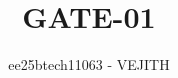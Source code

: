 \documentclass[journal]{IEEEtran}
\begin{document}

\vspace{3cm}


\title{GATE-01}
\author{ee25btech11063 - VEJITH}
\maketitle
{\let\newpage\relax\maketitle}

\renewcommand{\thefigure}{\theenumi}
\renewcommand{\thetable}{\theenumi}
\setlength{\intextsep}{10pt} %
\end{document}
